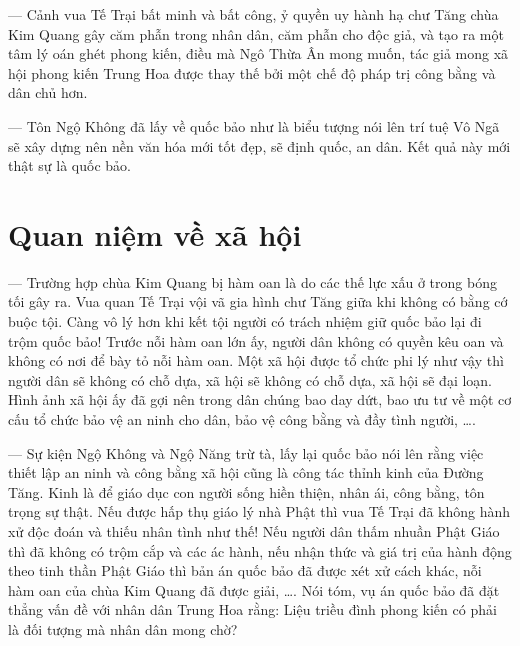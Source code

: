 --- Cảnh vua Tế Trại bất minh và bất công, ỷ quyền uy hành hạ chư Tăng chùa Kim Quang gây căm phẫn trong nhân dân, căm phẫn cho độc giả, và tạo ra một tâm lý oán ghét phong kiến, điều mà Ngô Thừa Ân mong muốn, tác giả mong xã hội phong kiến Trung Hoa được thay thế bởi một chế độ pháp trị công bằng và dân chủ hơn.

--- Tôn Ngộ Không đã lấy về quốc bảo như là biểu tượng nói lên trí tuệ Vô Ngã sẽ xây dựng nên nền văn hóa mới tốt đẹp, sẽ định quốc, an dân. Kết quả này mới thật sự là quốc bảo.

\section{Quan niệm về xã hội} %
\label{sec:62_63_xa_hoi}

--- Trường hợp chùa Kim Quang bị hàm oan là do các thế lực xấu ở trong bóng tối gây ra. Vua quan Tế Trại vội vã gia hình chư Tăng giữa khi không có bằng cớ buộc tội. Càng vô lý hơn khi kết tội người có trách nhiệm giữ quốc bảo lại đi trộm quốc bảo! Trước nỗi hàm oan lớn ấy, người dân không có quyền kêu oan và không có nơi để bày tỏ nỗi hàm oan. Một xã hội được tổ chức phi lý như vậy thì người dân sẽ không có chỗ dựa, xã hội sẽ không có chỗ dựa, xã hội sẽ đại loạn. Hình ảnh xã hội ấy đã gợi nên trong dân chúng bao day dứt, bao ưu tư về một cơ cấu tổ chức bảo vệ an ninh cho dân, bảo vệ công bằng và đầy tình người, \ldots.

--- Sự kiện Ngộ Không và Ngộ Năng trừ tà, lấy lại quốc bảo nói lên rằng việc thiết lập an ninh và công bằng xã hội cũng là công tác thỉnh kinh của Đường Tăng. Kinh là để giáo dục con người sống hiền thiện, nhân ái, công bằng, tôn trọng sự thật. Nếu được hấp thụ giáo lý nhà Phật thì vua Tế Trại đã không hành xử độc đoán và thiếu nhân tình như thế! Nếu người dân thấm nhuần Phật Giáo thì đã không có trộm cắp và các ác hành, nếu nhận thức và giá trị của hành động theo tinh thần Phật Giáo thì bản án quốc bảo đã được xét xử cách khác, nỗi hàm oan của chùa Kim Quang đã được giải, \ldots. Nói tóm, vụ án quốc bảo đã đặt thẳng vấn đề với nhân dân Trung Hoa rằng: Liệu triều đình phong kiến có phải là đối tượng mà nhân dân mong chờ?
